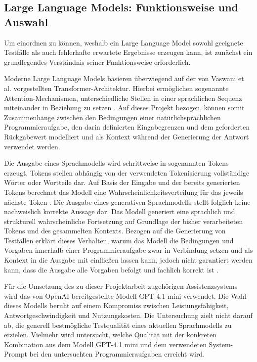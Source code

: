 \subsection{Large Language Models: Funktionsweise und Auswahl}
Um einordnen zu können, weshalb ein Large Language Model sowohl geeignete Testfälle als auch fehlerhafte erwartete 
Ergebnisse erzeugen kann, ist zunächst ein grundlegendes Verständnis seiner Funktionsweise erforderlich. 

Moderne Large Language Models basieren überwiegend auf der von Vaswani et al. vorgestellten 
Transformer-Architektur. Hierbei ermöglichen sogenannte Attention-Mechanismen, unterschiedliche Stellen 
in einer sprachlichen Sequenz miteinander in Beziehung zu setzen \cite{vaswani_attention_2017}. 
Auf dieses Projekt bezogen, können somit Zusammenhänge zwischen den Bedingungen einer natürlichsprachlichen 
Programmieraufgabe, den darin definierten Eingabegrenzen und dem geforderten 
Rückgabewert modelliert und als Kontext während der Generierung der Antwort verwendet werden.

Die Ausgabe eines Sprachmodells wird schrittweise in sogenannten Tokens erzeugt. Tokens stellen abhängig von der verwendeten 
Tokenisierung vollständige Wörter oder Wortteile dar. Auf Basis der Eingabe und der bereits generierten Tokens berechnet 
das Modell eine Wahrscheinlichkeitsverteilung für das jeweils nächste Token \cite{vaswani_attention_2017}. 
Die Ausgabe eines generativen Sprachmodells stellt folglich keine nachweislich korrekte Aussage dar. 
Das Modell generiert eine sprachlich und strukturell wahrscheinliche Fortsetzung auf Grundlage der bisher verarbeiteten 
Tokens und des gesammelten Kontexts. Bezogen auf die Generierung von Testfällen erklärt 
dieses Verhalten, warum das Modell die Bedingungen und Vorgaben innerhalb einer Programmieraufgabe 
zwar in Verbindung setzen und als Kontext in die Ausgabe mit einfließen lassen kann, jedoch nicht 
garantiert werden kann, dass die Ausgabe alle Vorgaben befolgt und fachlich korrekt ist \cite{huang_survey_2025}.  

Für die Umsetzung des zu dieser Projektarbeit zugehörigen Assistenzsystems wird das von OpenAI bereitgestellte 
Modell \acs{GPT}-4.1 mini verwendet. Die Wahl dieses Modells 
beruht auf einem Kompromiss zwischen Leistungsfähigkeit, Antwortgeschwindigkeit und Nutzungskosten. 
Die Untersuchung zielt nicht darauf ab, die generell bestmögliche Testqualität eines aktuellen Sprachmodells zu erzielen. 
Vielmehr wird untersucht, welche Qualität mit der konkreten Kombination aus dem Modell \acs{GPT}-4.1 mini und dem verwendeten System-Prompt 
bei den untersuchten Programmieraufgaben erreicht wird.

\newpage

